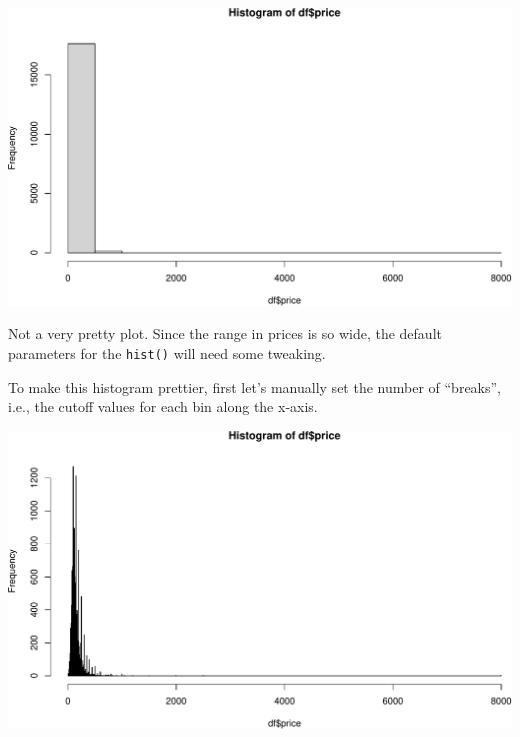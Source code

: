 \documentclass[
]{book}
\newenvironment{Shaded}{\begin{snugshade}}{\end{snugshade}}
\newcommand{\CommentTok}[1]{\textcolor[rgb]{0.56,0.35,0.01}{\textit{#1}}}
\newcommand{\DataTypeTok}[1]{\textcolor[rgb]{0.13,0.29,0.53}{#1}}
\newcommand{\DecValTok}[1]{\textcolor[rgb]{0.00,0.00,0.81}{#1}}
\newcommand{\KeywordTok}[1]{\textcolor[rgb]{0.13,0.29,0.53}{\textbf{#1}}}
\newcommand{\NormalTok}[1]{#1}
\newcommand{\OperatorTok}[1]{\textcolor[rgb]{0.81,0.36,0.00}{\textbf{#1}}}
\newcommand{\StringTok}[1]{\textcolor[rgb]{0.31,0.60,0.02}{#1}}
\begin{document}
\includegraphics{figures/unnamed-chunk-213-1.pdf}

Not a very pretty plot. Since the range in prices is so wide, the default parameters for the \texttt{hist()} will need some tweaking.

To make this histogram prettier, first let's manually set the number of ``breaks'', i.e., the cutoff values for each bin along the x-axis.

\begin{Shaded}
\end{Shaded}

\includegraphics{figures/unnamed-chunk-214-1.pdf}
\end{document}
